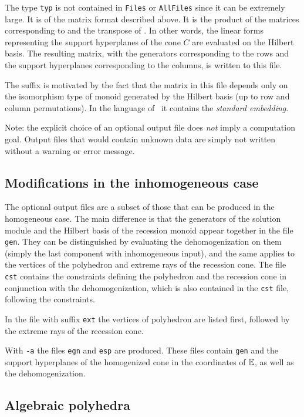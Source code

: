 The type \verb|typ| is not contained in \verb|Files| or \verb|AllFiles| since it can be extremely large. It is of the matrix format described above. It is the product of the matrices
corresponding to  and the transpose of . In other
words, the linear forms representing the support
hyperplanes of the cone $C$ are evaluated on the
Hilbert basis. The resulting matrix, with the
generators corresponding to the rows and the support
hyperplanes corresponding to the columns, is written to
this file.

The suffix  is motivated by the fact that the
matrix in this file depends only on the isomorphism
type of monoid generated by the Hilbert basis (up to
row and column permutations). In the language of~\cite{BG}
it contains the \emph{standard embedding}.

Note: the explicit choice of an optional output file does \emph{not} imply a computation goal. Output files that would contain unknown data are simply not written without a warning or error message.

\subsection{Modifications in the inhomogeneous case}

The optional output files are a subset of those that can be produced in the homogeneous
case. The main difference is that the generators of the solution module and the
Hilbert basis of the recession monoid appear together in the file \verb|gen|.
They can be distinguished by evaluating the dehomogenization on them (simply the last component with inhomogeneous input), and the
same applies to the vertices of the polyhedron and extreme rays of the
recession cone. The file \verb|cst| contains the constraints defining the
polyhedron and the recession cone in conjunction with the dehomogenization, which is also contained in the \verb|cst| file, following the constraints.

In the file with suffix \verb|ext| the vertices of polyhedron are listed first, followed by the extreme rays of the recession cone.

With \verb|-a| the files \verb|egn| and \verb|esp| are produced. These files contain \verb|gen| and the support hyperplanes of the homogenized cone in the coordinates of ${\mathbb E}$, as well as the dehomogenization.

\subsection{Algebraic polyhedra}

